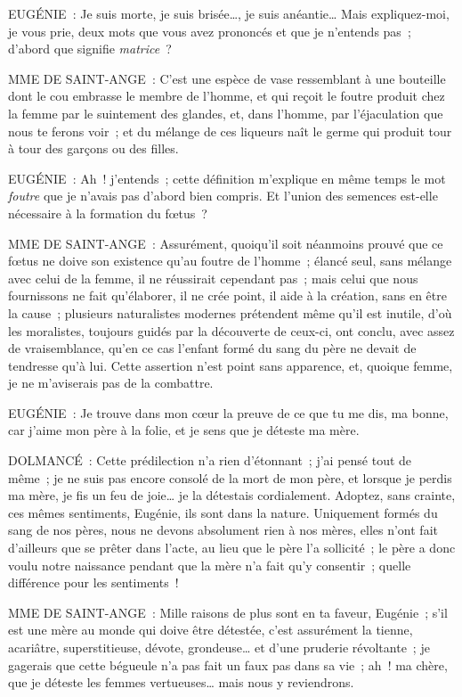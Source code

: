 \documentclass[french,twoside]{book} %
\begin{document}
EUGÉNIE : Je suis morte, je suis brisée…, je suis anéantie… Mais expliquez-moi, je vous prie, deux mots que vous avez prononcés et que je n’entends pas ; d’abord que signifie {\itshape matrice} ?\par
MME DE SAINT-ANGE : C’est une espèce de vase ressemblant à une bouteille dont le cou embrasse le membre de l’homme, et qui reçoit le foutre produit chez la femme par le suintement des glandes, et, dans l’homme, par l’éjaculation que nous te ferons voir ; et du mélange de ces liqueurs naît le germe qui produit tour à tour des garçons ou des filles.\par
EUGÉNIE : Ah ! j’entends ; cette définition m’explique en même temps le mot {\itshape foutre} que je n’avais pas d’abord bien compris. Et l’union des semences est-elle nécessaire à la formation du fœtus ?\par
MME DE SAINT-ANGE : Assurément, quoiqu’il soit néanmoins prouvé que ce fœtus ne doive son existence qu’au foutre de l’homme ; élancé seul, sans mélange avec celui de la femme, il ne réussirait cependant pas ; mais celui que nous fournissons ne fait qu’élaborer, il ne crée point, il aide à la création, sans en être la cause ; plusieurs naturalistes modernes prétendent même qu’il est inutile, d’où les moralistes, toujours guidés par la découverte de ceux-ci, ont conclu, avec assez de vraisemblance, qu’en ce cas l’enfant formé du sang du père ne devait de tendresse qu’à lui. Cette assertion n’est point sans apparence, et, quoique femme, je ne m’aviserais pas de la combattre.\par
EUGÉNIE : Je trouve dans mon cœur la preuve de ce que tu me dis, ma bonne, car j’aime mon père à la folie, et je sens que je déteste ma mère.\par
DOLMANCÉ : Cette prédilection n’a rien d’étonnant ; j’ai pensé tout de même ; je ne suis pas encore consolé de la mort de mon père, et lorsque je perdis ma mère, je fis un feu de joie… je la détestais cordialement. Adoptez, sans crainte, ces mêmes sentiments, Eugénie, ils sont dans la nature. Uniquement formés du sang de nos pères, nous ne devons absolument rien à nos mères, elles n’ont fait d’ailleurs que se prêter dans l’acte, au lieu que le père l’a sollicité ; le père a donc voulu notre naissance pendant que la mère n’a fait qu’y consentir ; quelle différence pour les sentiments !\par
MME DE SAINT-ANGE : Mille raisons de plus sont en ta faveur, Eugénie ; s’il est une mère au monde qui doive être détestée, c’est assurément la tienne, acariâtre, superstitieuse, dévote, grondeuse… et d’une pruderie révoltante ; je gagerais que cette bégueule n’a pas fait un faux pas dans sa vie ; ah ! ma chère, que je déteste les femmes vertueuses… mais nous y reviendrons.\par
\end{document}
